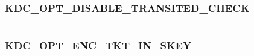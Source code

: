 \documentclass[letterpaper,10pt,english]{sphinxmanual}
\begin{document}
\begin{fulllineitems}
\label{appdev/refs/macros/KDC_OPT_CNAME_IN_ADDL_TKT:KDC_OPT_CNAME_IN_ADDL_TKT}
\end{fulllineitems}


\begin{tabulary}{\linewidth}{|L|L|}
\hline

 & 
\\
\hline\end{tabulary}



\subsubsection{KDC\_OPT\_DISABLE\_TRANSITED\_CHECK}
\label{appdev/refs/macros/KDC_OPT_DISABLE_TRANSITED_CHECK:kdc-opt-disable-transited-check}\label{appdev/refs/macros/KDC_OPT_DISABLE_TRANSITED_CHECK::doc}\label{appdev/refs/macros/KDC_OPT_DISABLE_TRANSITED_CHECK:kdc-opt-disable-transited-check-data}

\begin{fulllineitems}
\label{appdev/refs/macros/KDC_OPT_DISABLE_TRANSITED_CHECK:KDC_OPT_DISABLE_TRANSITED_CHECK}
\end{fulllineitems}


\begin{tabulary}{\linewidth}{|L|L|}
\hline

 & 
\\
\hline\end{tabulary}



\subsubsection{KDC\_OPT\_ENC\_TKT\_IN\_SKEY}
\label{appdev/refs/macros/KDC_OPT_ENC_TKT_IN_SKEY:kdc-opt-enc-tkt-in-skey}\label{appdev/refs/macros/KDC_OPT_ENC_TKT_IN_SKEY::doc}\label{appdev/refs/macros/KDC_OPT_ENC_TKT_IN_SKEY:kdc-opt-enc-tkt-in-skey-data}

\begin{fulllineitems}
\label{appdev/refs/macros/KDC_OPT_ENC_TKT_IN_SKEY:KDC_OPT_ENC_TKT_IN_SKEY}
\end{fulllineitems}
\end{document}
